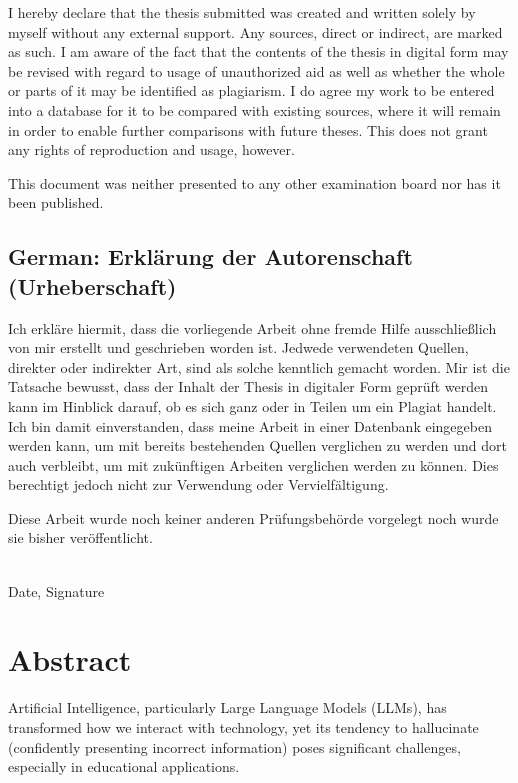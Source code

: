 \documentclass[a4paper,11pt,oneside]{article}
\begin{document}
  I hereby declare that the thesis submitted was created and written
  solely by myself without any external support. Any sources, direct
  or indirect, are marked as such. I am aware of the fact that the
  contents of the thesis in digital form may be revised with regard to
  usage of unauthorized aid as well as whether the whole or parts of
  it may be identified as plagiarism. I do agree my work to be entered
  into a database for it to be compared with existing sources, where
  it will remain in order to enable further comparisons with future
  theses. This does not grant any rights of reproduction and usage,
  however.

  This document was neither presented to any other examination board
  nor has it been published.

  \subsection*{German: Erklärung der Autorenschaft (Urheberschaft)}
 
  Ich erkläre hiermit, dass die vorliegende Arbeit ohne fremde Hilfe
  ausschließlich von mir erstellt und geschrieben worden ist. Jedwede
  verwendeten Quellen, direkter oder indirekter Art, sind als solche
  kenntlich gemacht worden. Mir ist die Tatsache bewusst, dass der
  Inhalt der Thesis in digitaler Form geprüft werden kann im Hinblick
  darauf, ob es sich ganz oder in Teilen um ein Plagiat handelt. Ich
  bin damit einverstanden, dass meine Arbeit in einer Datenbank
  eingegeben werden kann, um mit bereits bestehenden Quellen
  verglichen zu werden und dort auch verbleibt, um mit zukünftigen
  Arbeiten verglichen werden zu können. Dies berechtigt jedoch nicht
  zur Verwendung oder Vervielfältigung.

  Diese Arbeit wurde noch keiner anderen Prüfungsbehörde vorgelegt
  noch wurde sie bisher veröffentlicht.

  \vspace{20mm}

  \dotfill\\
  Date, Signature

  \newpage

  \section*{Abstract}
  
  Artificial Intelligence, particularly Large Language Models (LLMs), has transformed how we interact with technology, 
  yet its tendency to hallucinate (confidently presenting incorrect information) poses significant challenges, especially in educational applications.
\end{document}
